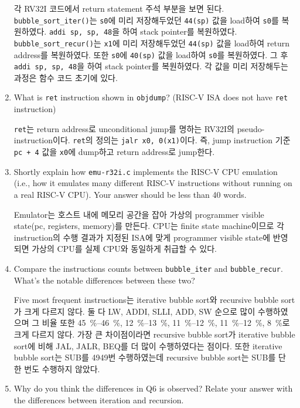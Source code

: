 \documentclass[
    a4paper,
    oneside,
    adjustmath,
    finemath,
    itemph,
    nonfrench,
    11pt
]{oblivoir}
\begin{document}
\begin{enumerate}
        각 RV32I 코드에서 return statement 주석 부분을 보면 된다.
        \verb|bubble_sort_iter()|는 \verb|s0|에 미리 저장해두었던 \verb|44(sp)| 값을 load하여 \verb|s0|를 복원하였다.
        \verb|addi sp, sp, 48|을 하여 stack pointer를 복원하였다.
        \verb|bubble_sort_recur()|는 \verb|x1|에 미리 저장해두었던 \verb|44(sp)| 값을 load하여 return address를 복원하였다.
        또한 \verb|s0|에 \verb|40(sp)| 값을 load하여 \verb|s0|를 복원하였다.
        그 후 \verb|addi sp, sp, 48|을 하여 stack pointer를 복원하였다.
        각 값을 미리 저장해두는 과정은 함수 코드 초기에 있다.
        \item What is \verb|ret| instruction shown in \verb|objdump|? (RISC-V ISA does not have \verb|ret| instruction)

        \verb|ret|는 return address로 unconditional jump를 명하는 RV32I의 pseudo-instruction이다.
        \verb|ret|의 정의는 \verb|jalr x0, 0(x1)|이다.
        즉, jump instruction 기준 \verb|pc + 4| 값을 \verb|x0|에 dump하고 return address로 jump한다.
        \item Shortly explain how \verb|emu-r32i.c| implements the RISC-V CPU emulation (i.e., how it emulates many different RISC-V instructions without running on a real RISC-V CPU). Your answer should be less than 40 words.

        Emulator는 호스트 내에 메모리 공간을 잡아 가상의 programmer visible state(pc, registers, memory)를 만든다.
        CPU는 finite state machine이므로 각 instruction의 수행 결과가 지정된 ISA에 맞게 programmer visible state에 반영되면 가상의 CPU를 실제 CPU와 동일하게 취급할 수 있다.
        \item Compare the instructions counts between \verb|bubble_iter| and \verb|bubble_recur|. What's the notable differences between these two?

        Five most frequent instructions는 iterative bubble sort와 recursive bubble sort가 크게 다르지 않다.
        둘 다 LW, ADDI, SLLI, ADD, SW 순으로 많이 수행하였으며 그 비율 또한 \SIrange{45}{46}{\percent}, \SIrange{12}{13}{\percent}, \SIrange{11}{12}{\percent}, \SIrange{11}{12}{\percent}, \SI{8}{\percent}로 크게 다르지 않다.
        가장 큰 차이점이라면 recursive bubble sort가 iterative bubble sort에 비해 JAL, JALR, BEQ를 더 많이 수행하였다는 점이다.
        또한 iterative bubble sort는 SUB를 4949번 수행하였는데 recursive bubble sort는 SUB를 단 한 번도 수행하지 않았다.
        \item Why do you think the differences in Q6 is observed? Relate your answer with the differences between iteration and recursion.


\end{enumerate}
\end{document}
